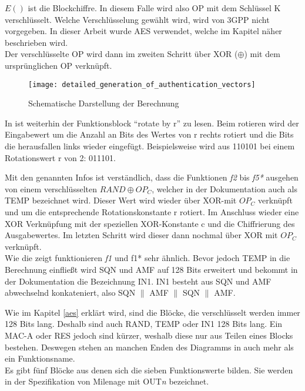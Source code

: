  $E()$ ist die Blockchiffre. In diesem Falle wird also \ac{OP} mit dem Schlüssel \ac{K}
 verschlüsselt. Welche Verschlüsselung gewählt wird, wird von 3GPP nicht vorgegeben. In
 dieser Arbeit wurde \ac{AES} verwendet, welche im Kapitel  näher beschrieben wird. \\
 Der verschlüsselte OP wird dann im zweiten Schritt über XOR ($\oplus$) mit dem ursprünglichen
 OP verknüpft.
 
 \begin{figure}[ht]
  \begin{center}
   \texttt{[image: detailed\_generation\_of\_authentication\_vectors]}
  \end{center}
  \caption[Schematische Darstellung der Berechnung der Authentifizierungsvektoren]{Schematische Darstellung der Berechnung \cite{3gpp.33.102}}
  \label{fig:schematisch_milenage}
 \end{figure}
 
 In  ist weiterhin der Funktionsblock ``rotate by r'' zu lesen.
 Beim rotieren wird der Eingabewert um die Anzahl an Bits des Wertes von r rechts rotiert und %
 die Bits die herausfallen links wieder eingefügt. Beispielsweise wird aus 110101 bei einem
 Rotationswert r von 2: 011101.
 
 Mit den genannten Infos ist verständlich, dass die Funktionen \emph{f2} bis \emph{f5*}
 ausgehen von einem verschlüsselten $RAND \oplus OP_C$, welcher in der Dokumentation
 auch als TEMP bezeichnet wird. Dieser Wert wird wieder über XOR-mit $OP_ C$ verknüpft
 und um die entsprechende Rotationskonstante r rotiert. Im Anschluss wieder eine XOR
 Verknüpfung mit der speziellen XOR-Konstante c und die Chiffrierung des Ausgabewertes. Im
 letzten Schritt wird dieser dann nochmal über XOR mit $OP_{C}$ verknüpft. \\
 Wie die  zeigt funktionieren \emph{f1} und {f1*} sehr
 ähnlich. Bevor jedoch TEMP in die Berechnung einfließt wird SQN und AMF auf 128 Bits
 erweitert und bekommt in der Dokumentation die Bezeichnung IN1. IN1 besteht aus SQN und
 AMF abwechselnd konkateniert, also SQN $\|$ AMF $\|$ SQN $\|$ AMF. \cite{3gpp.33.102}
 
 Wie im Kapitel \ref{aes} erklärt wird, sind die Blöcke, die verschlüsselt werden immer
 128 Bits lang. Deshalb sind auch RAND, TEMP oder IN1 128 Bits lang. Ein MAC-A oder RES
 jedoch sind kürzer, weshalb diese nur aus Teilen eines Blocks bestehen. Deswegen stehen
 an manchen Enden des Diagramms in  auch mehr als ein
 Funktionsname. \\
 Es gibt fünf Blöcke aus denen sich die sieben Funktionswerte bilden. Sie werden in der
 Spezifikation von Milenage mit OUT\emph{n} bezeichnet.
 
